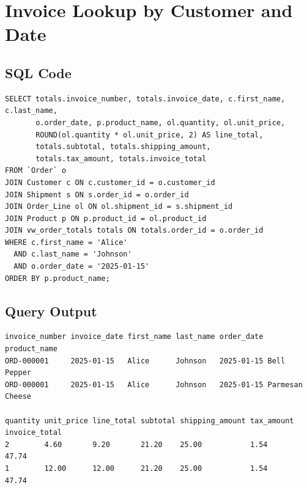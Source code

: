\section{Invoice Lookup by Customer and Date}

\subsection{SQL Code}
{\scriptsize
\begin{verbatim}
SELECT totals.invoice_number, totals.invoice_date, c.first_name, c.last_name,
       o.order_date, p.product_name, ol.quantity, ol.unit_price,
       ROUND(ol.quantity * ol.unit_price, 2) AS line_total,
       totals.subtotal, totals.shipping_amount,
       totals.tax_amount, totals.invoice_total
FROM `Order` o
JOIN Customer c ON c.customer_id = o.customer_id
JOIN Shipment s ON s.order_id = o.order_id
JOIN Order_Line ol ON ol.shipment_id = s.shipment_id
JOIN Product p ON p.product_id = ol.product_id
JOIN vw_order_totals totals ON totals.order_id = o.order_id
WHERE c.first_name = 'Alice'
  AND c.last_name = 'Johnson'
  AND o.order_date = '2025-01-15'
ORDER BY p.product_name;
\end{verbatim}
}

\subsection{Query Output}
{\scriptsize
\begin{verbatim}
invoice_number invoice_date first_name last_name order_date  product_name
ORD-000001     2025-01-15   Alice      Johnson   2025-01-15 Bell Pepper
ORD-000001     2025-01-15   Alice      Johnson   2025-01-15 Parmesan Cheese

quantity unit_price line_total subtotal shipping_amount tax_amount invoice_total
2        4.60       9.20       21.20    25.00           1.54       47.74
1        12.00      12.00      21.20    25.00           1.54       47.74
\end{verbatim}
}

